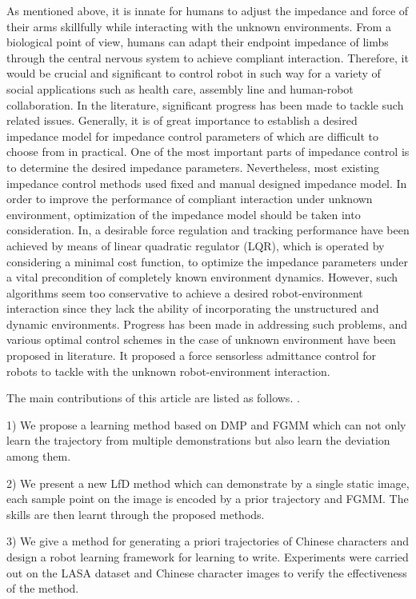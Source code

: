 \documentclass[journal]{IEEEtran}
\begin{document}
As mentioned above, it is innate for humans to adjust the impedance and force of their arms skillfully while interacting with the unknown environments. From a biological point of view, humans can adapt their endpoint impedance of limbs through the central nervous system to achieve compliant interaction. Therefore, it would be crucial and significant to control robot in such way for a variety of social applications such as health care, assembly line and human-robot collaboration. In the literature, significant progress has been made to tackle such related issues. Generally, it is of great importance to establish a desired impedance model for impedance control parameters of which are difficult to choose from in practical. One of the most important parts of impedance control is to determine the desired impedance parameters. Nevertheless, most existing impedance control methods used fixed and manual designed impedance model. In order to improve the performance of compliant interaction under unknown environment, optimization of the impedance model should be taken into consideration. In, a desirable force regulation and tracking performance have been achieved by means of linear quadratic regulator (LQR), which is operated by considering a minimal cost function, to optimize the impedance parameters under a vital precondition of completely known environment dynamics. However, such algorithms seem too conservative to achieve a desired robot-environment interaction since they lack the ability of incorporating the unstructured and dynamic environments. Progress has been made in addressing such problems, and various optimal control schemes in the case of unknown environment have been proposed in literature. It proposed a force sensorless admittance control for robots to tackle with the unknown robot-environment interaction.

The main contributions of this article are listed as follows. \cite{Ju2012}.

1) We propose a learning method based on DMP and FGMM which can not only learn the trajectory from multiple demonstrations but also learn the deviation among them.

2) We present a new LfD method which can demonstrate by a single static image, each sample point on the image is encoded by a prior trajectory and FGMM. The skills are then learnt through the proposed methods.

3) We give a method for generating a priori trajectories of Chinese characters and design a robot learning framework for learning to write. Experiments were carried out on the LASA dataset and Chinese character images to verify the effectiveness of the method.
\end{document}

